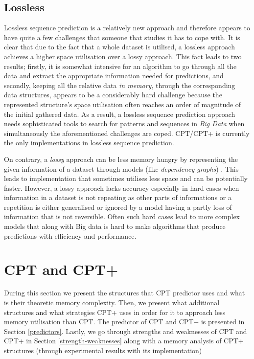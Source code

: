 \subsection*{Lossless}\label{losslessVSlossy}
Lossless sequence prediction is a relatively new approach and therefore appears to have quite a few challenges that someone that studies it has to cope with. It is clear that due to the fact that a whole dataset is utilised, a lossless approach achieves a higher space utilisation over a lossy approach. This fact leads to two results; firstly, it is somewhat intensive for an algorithm to go through all the data and extract the appropriate information needed for predictions, and secondly, keeping all the relative data \emph{in memory}, through the corresponding data structures, appears to be a considerably hard challenge because the represented structure's space utilisation often reaches an order of magnitude of the initial gathered data. As a result, a lossless sequence prediction approach needs sophisticated tools to search for patterns and sequences in \emph{Big Data} when simultaneously the aforementioned challenges are coped. CPT/CPT+ is currently the only implementations in lossless sequence prediction. 
\par On contrary, a \emph{lossy} approach can be less memory hungry by representing the given information of a dataset through models (like \emph{dependency graphs}) \cite{Padmanabhan:1996:UPP:235160.235164}. This leads to implementation that sometimes utilises less space and can be potentially faster. However, a lossy approach lacks accuracy especially in hard cases when information in a dataset is not repeating as other parts of informations or a repetition is either generalised or ignored by a model having a partly loss of information that is not reversible. Often such hard cases lead to more complex models that along with Big data is hard to make algorithms that produce predictions with efficiency and performance.

\section{CPT and CPT+}\label{CPT}
During this section we present the structures that CPT predictor uses and what is their theoretic memory complexity. Then, we present what additional structures and what strategies CPT+ uses in order for it to approach less memory utilisation than CPT. The predictor of CPT and CPT+ is presented in Section \ref{predictors}. Lastly, we go through strengths and weaknesses of CPT and CPT+ in Section \ref{strength-weaknesses} along with a memory analysis of CPT+ structures (through experimental results with its implementation)
